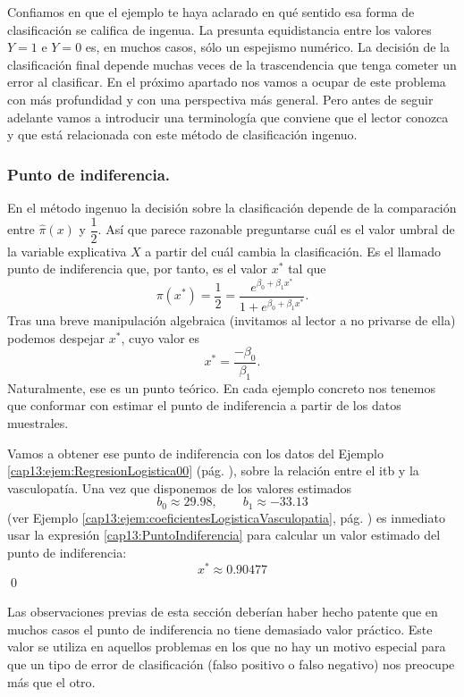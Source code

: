 Confiamos en que el ejemplo te haya aclarado en qué sentido esa forma de clasificación se califica de ingenua. La presunta equidistancia entre los valores $Y=1$ e $Y=0$ es, en muchos casos, sólo un espejismo numérico. La decisión de la clasificación final depende muchas veces de la trascendencia que tenga cometer un error al clasificar. En el próximo apartado nos vamos a ocupar de este problema con más profundidad y con una perspectiva más general. Pero antes de seguir adelante vamos a introducir una terminología que conviene que el lector conozca y que está relacionada con este método de clasificación ingenuo.

\subsubsection*{Punto de indiferencia.}

En el método ingenuo la decisión sobre la clasificación depende de la comparación entre  $ \hat{\pi}(x)$ y $\dfrac{1}{2}$. Así que parece razonable preguntarse cuál es el valor umbral de la variable explicativa $X$ a partir del cuál cambia la clasificación.
Es el llamado {\sf punto de indiferencia} que, por tanto, es  el valor $x^*$ tal que
\[\pi(x^ *)=\dfrac{1}{2}=\dfrac{e^{\beta_0+\beta_1 x^*}}{1+ e^{\beta_0+\beta_1 x^*}}.\]
Tras una breve manipulaci\'on algebraica (invitamos al lector a no privarse de ella)  podemos despejar $x^*$, cuyo valor es
\begin{equation}\label{cap13:PuntoIndiferencia}
	x^*=\dfrac{-\beta_0}{\beta_1}.
\end{equation}
Naturalmente, ese es un punto teórico. En cada ejemplo concreto nos tenemos que conformar con estimar el punto de indiferencia a partir de los datos muestrales.

\begin{ejemplo}\label{cap13:EjemploPuntoIndiferencia} Vamos a obtener ese punto de indiferencia con los datos del Ejemplo \ref{cap13:ejem:RegresionLogistica00}
 (pág.  \pageref{cap13:ejem:RegresionLogistica00}), sobre la relación entre el itb y la vasculopatía. Una vez que disponemos de  los valores estimados
 \[
b_0 \approx 29.98, \qquad b_1 \approx -33.13
\]
(ver Ejemplo \ref{cap13:ejem:coeficientesLogisticaVasculopatia}, pág. \pageref{cap13:ejem:coeficientesLogisticaVasculopatia}) es inmediato usar la expresi\'on
\eqref{cap13:PuntoIndiferencia} para calcular un valor estimado del punto de indiferencia:
\[x^*\approx 0.90477\]
\qed
\end{ejemplo}
Las observaciones previas de esta sección deberían haber hecho patente que en muchos casos el punto de indiferencia
no tiene demasiado valor práctico. Este valor se utiliza en aquellos problemas en los que no hay un motivo especial para que un tipo de error de clasificación (falso positivo o falso negativo) nos preocupe más que el otro.

